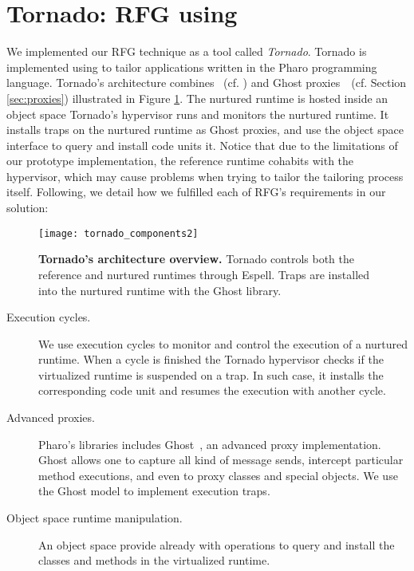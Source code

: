 \section{Tornado: RFG using \Vtt} \label{sec:rfg_implementation}

We implemented our RFG technique as a tool called \emph{Tornado}. Tornado is implemented using \Vtt to tailor applications written in the Pharo programming language.
Tornado's architecture combines \Vtt~(cf. ) and Ghost proxies~\cite{Mart14z}~(cf. Section \ref{sec:proxies}) illustrated in Figure \ref{fig:tornado_code units}. The nurtured runtime is hosted inside an object space Tornado's hypervisor runs and monitors the nurtured runtime. It installs traps on the nurtured runtime as Ghost proxies, and use the object space interface to query and install code units it. Notice that due to the limitations of our prototype implementation, the reference runtime cohabits with the hypervisor, which may cause problems when trying to tailor the tailoring process itself. Following, we detail how we fulfilled each of RFG's requirements in our solution:

\begin{figure}[ht]
\begin{center}
\texttt{[image: tornado\_components2]}
\caption{\textbf{Tornado's architecture overview.} Tornado controls both the reference and nurtured runtimes through Espell. Traps are installed into the nurtured runtime with the Ghost library.\label{fig:tornado_code units}}
\end{center}
\end{figure}

\begin{description}
\item[Execution cycles.] We use \Vtt execution cycles to monitor and control the execution of a nurtured runtime. When a cycle is finished the Tornado hypervisor checks if the virtualized runtime is suspended on a trap. In such case, it installs the corresponding code unit and resumes the execution with another cycle.

\item[Advanced proxies.] Pharo's libraries includes Ghost~\cite{Mart11a}, an advanced proxy implementation. Ghost allows one to capture all kind of message sends, intercept particular method executions, and even to proxy classes and special objects. We use the Ghost model to implement execution traps.

\item[Object space runtime manipulation.] An object space provide already with operations to query and install the classes and methods in the virtualized runtime.

\end{description}

